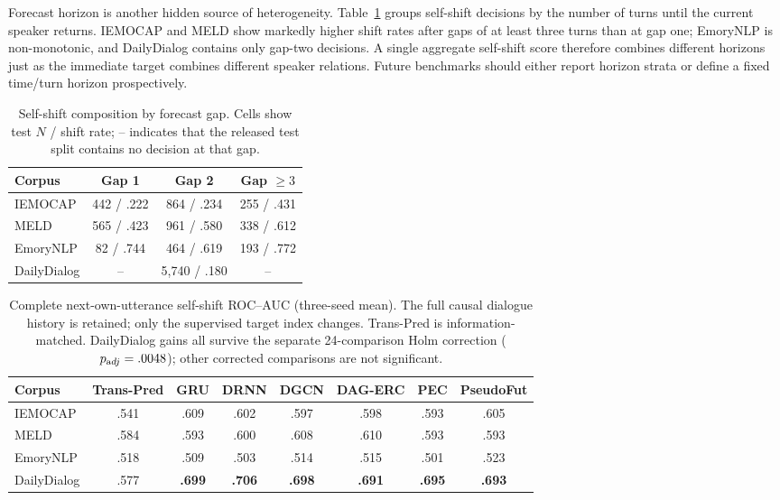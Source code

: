 \documentclass{ieeeaccess}
\begin{document}
Forecast horizon is another hidden source of heterogeneity. Table~\ref{tab:horizon} groups
self-shift decisions by the number of turns until the current speaker returns. IEMOCAP and MELD
show markedly higher shift rates after gaps of at least three turns than at gap one; EmoryNLP is
non-monotonic, and DailyDialog contains only gap-two decisions. A single aggregate self-shift score
therefore combines different horizons just as the immediate target combines different speaker
relations. Future benchmarks should either report horizon strata or define a fixed time/turn
horizon prospectively.

\begin{table}[t]
\centering
\footnotesize
\caption{Self-shift composition by forecast gap. Cells show test $N$ / shift rate; -- indicates
that the released test split contains no decision at that gap.}
\label{tab:horizon}
\begin{tabular}{lccc}
\toprule
Corpus & Gap 1 & Gap 2 & Gap $\geq3$ \\
\midrule
IEMOCAP     & 442 / .222 & 864 / .234 & 255 / .431 \\
MELD        & 565 / .423 & 961 / .580 & 338 / .612 \\
EmoryNLP    & 82 / .744  & 464 / .619 & 193 / .772 \\
DailyDialog & --         & 5{,}740 / .180 & -- \\
\bottomrule
\end{tabular}
\end{table}

\begin{table}[t]
\centering
\footnotesize
\caption{Complete next-own-utterance self-shift ROC--AUC (three-seed mean). The full causal dialogue
history is retained; only the supervised target index changes. Trans-Pred is information-matched.
DailyDialog gains all survive the separate 24-comparison Holm correction ($p_{\rm adj}=.0048$);
other corrected comparisons are not significant.}
\label{tab:selfmodels}
\begin{tabular}{lccccccc}\toprule
Corpus & Trans-Pred & GRU & DRNN & DGCN & DAG-ERC & PEC & PseudoFut \\
\midrule
IEMOCAP     & .541 & .609 & .602 & .597 & .598 & .593 & .605 \\
MELD        & .584 & .593 & .600 & .608 & .610 & .593 & .593 \\
EmoryNLP    & .518 & .509 & .503 & .514 & .515 & .501 & .523 \\
DailyDialog & .577 & \textbf{.699} & \textbf{.706} & \textbf{.698} & \textbf{.691} & \textbf{.695} & \textbf{.693} \\
\bottomrule
\end{tabular}
\end{table}
\end{document}
